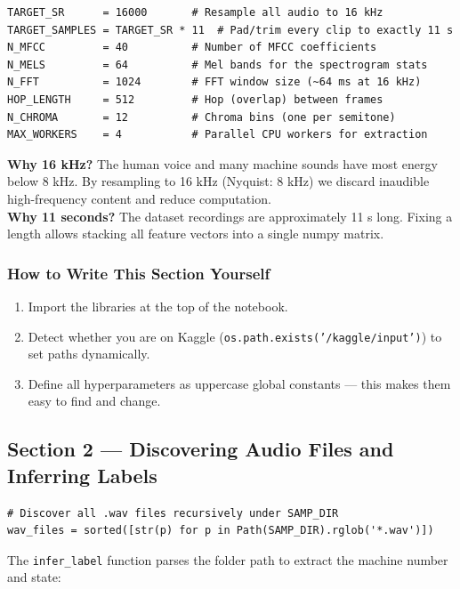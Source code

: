 \documentclass[12pt,a4paper]{article}
\begin{document}
\begin{lstlisting}
TARGET_SR      = 16000       # Resample all audio to 16 kHz
TARGET_SAMPLES = TARGET_SR * 11  # Pad/trim every clip to exactly 11 s
N_MFCC         = 40          # Number of MFCC coefficients
N_MELS         = 64          # Mel bands for the spectrogram stats
N_FFT          = 1024        # FFT window size (~64 ms at 16 kHz)
HOP_LENGTH     = 512         # Hop (overlap) between frames
N_CHROMA       = 12          # Chroma bins (one per semitone)
MAX_WORKERS    = 4           # Parallel CPU workers for extraction
\end{lstlisting}

\begin{infobox}
\textbf{Why 16 kHz?} The human voice and many machine sounds have most energy below 8 kHz. By resampling to 16 kHz (Nyquist: 8 kHz) we discard inaudible high-frequency content and reduce computation. \\[4pt]
\textbf{Why 11 seconds?} The dataset recordings are approximately 11 s long. Fixing a length allows stacking all feature vectors into a single numpy matrix.
\end{infobox}

\subsubsection{How to Write This Section Yourself}

\begin{enumerate}
  \item Import the libraries at the top of the notebook.
  \item Detect whether you are on Kaggle (\texttt{os.path.exists('/kaggle/input')}) to set paths dynamically.
  \item Define all hyperparameters as uppercase global constants --- this makes them easy to find and change.
\end{enumerate}

\subsection{Section 2 --- Discovering Audio Files and Inferring Labels}

\begin{lstlisting}
# Discover all .wav files recursively under SAMP_DIR
wav_files = sorted([str(p) for p in Path(SAMP_DIR).rglob('*.wav')])
\end{lstlisting}

The \texttt{infer\_label} function parses the folder path to extract the machine number and state:
\end{document}
